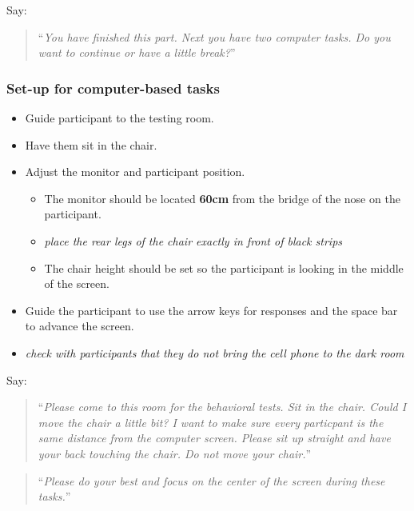\documentclass[]{article}
\providecommand{\tightlist}{%
  \setlength{\itemsep}{0pt}\setlength{\parskip}{0pt}}
\begin{document}
Say:

\begin{quote}
``\emph{You have finished this part. Next you have two computer tasks.
Do you want to continue or have a little break?}''
\end{quote}

\hypertarget{set-up-for-computer-based-tasks-1}{%
\subsubsection{Set-up for computer-based
tasks}\label{set-up-for-computer-based-tasks-1}}

\begin{itemize}
\tightlist
\item
  Guide participant to the testing room.
\item
  Have them sit in the chair.
\item
  Adjust the monitor and participant position.

  \begin{itemize}
  \tightlist
  \item
    The monitor should be located \textbf{60cm} from the bridge of the
    nose on the participant.
  \item
    \emph{place the rear legs of the chair exactly in front of black
    strips}
  \item
    The chair height should be set so the participant is looking in the
    middle of the screen.
  \end{itemize}
\item
  Guide the participant to use the arrow keys for responses and the
  space bar to advance the screen.
\item
  \emph{check with participants that they do not bring the cell phone to
  the dark room}
\end{itemize}

Say:

\begin{quote}
``\emph{Please come to this room for the behavioral tests. Sit in the
chair. Could I move the chair a little bit? I want to make sure every
particpant is the same distance from the computer screen. Please sit up
straight and have your back touching the chair. Do not move your
chair.}''
\end{quote}

\begin{quote}
``\emph{Please do your best and focus on the center of the screen during
these tasks.}''
\end{quote}
\end{document}
